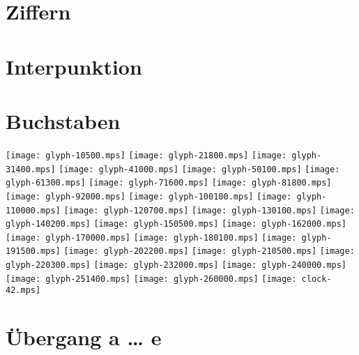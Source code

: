 \documentclass[a4paper,landscape]{article}
\begin{document}
\pagestyle{empty}
%
\newcommand{\showglyphs}[1]{%
  \directlua{\unexpanded{
     for index = #1,#1+99 do
         tex.print("\\IfFileExists{glyph-" .. index .. ".mps}{\\texttt{[image: glyph-" .. index ..".mps]} }{}")
     end
  }
}}
\tableofcontents
\section{Ziffern}
\section{Interpunktion}
\section{Buchstaben}
\newlength\digitwidth
\digitwidth=2.5cm
\texttt{[image: glyph-10500.mps]}  %
\texttt{[image: glyph-21800.mps]}  %
\texttt{[image: glyph-31400.mps]}  %
\texttt{[image: glyph-41000.mps]}  %
\texttt{[image: glyph-50100.mps]}  %
\texttt{[image: glyph-61300.mps]}  %
\texttt{[image: glyph-71600.mps]}  %
\texttt{[image: glyph-81800.mps]}  %
\texttt{[image: glyph-92000.mps]}  %
\texttt{[image: glyph-100100.mps]} %
\texttt{[image: glyph-110000.mps]} %
\texttt{[image: glyph-120700.mps]} %
\texttt{[image: glyph-130100.mps]} %
\texttt{[image: glyph-140200.mps]} %
\texttt{[image: glyph-150500.mps]} %
\texttt{[image: glyph-162000.mps]} %
\texttt{[image: glyph-170000.mps]} %
\texttt{[image: glyph-180100.mps]} %
\texttt{[image: glyph-191500.mps]} %
\texttt{[image: glyph-202200.mps]} %
\texttt{[image: glyph-210500.mps]} %
\texttt{[image: glyph-220300.mps]} %
\texttt{[image: glyph-232000.mps]} %
\texttt{[image: glyph-240000.mps]} %
\texttt{[image: glyph-251400.mps]} %
\texttt{[image: glyph-260000.mps]} %
\texttt{[image: clock-42.mps]} %
\newpage
\digitwidth=1.75cm
\section{Übergang a … e }
\end{document}

